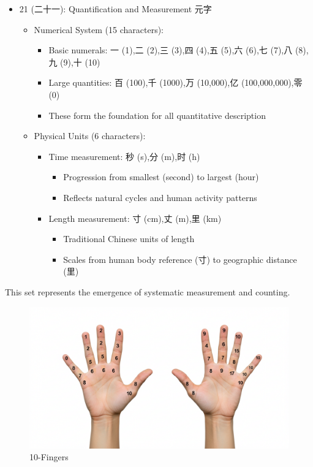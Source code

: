 \documentclass[
  11pt,
  letterpaper,
]{article}
\providecommand{\tightlist}{%
  \setlength{\itemsep}{0pt}\setlength{\parskip}{0pt}}
\begin{document}
\begin{itemize}
\tightlist
\item
  21 (二十一): Quantification and Measurement 元字

  \begin{itemize}
  \tightlist
  \item
    Numerical System (15 characters):

    \begin{itemize}
    \tightlist
    \item
      Basic numerals: 一 (1),二 (2),三 (3),四 (4),五 (5),六 (6),七
      (7),八 (8),九 (9),十 (10)
    \item
      Large quantities: 百 (100),千 (1000),万 (10,000),亿
      (100,000,000),零 (0)
    \item
      These form the foundation for all quantitative description
    \end{itemize}
  \item
    Physical Units (6 characters):

    \begin{itemize}
    \tightlist
    \item
      Time measurement: 秒 (s),分 (m),时 (h)

      \begin{itemize}
      \tightlist
      \item
        Progression from smallest (second) to largest (hour)
      \item
        Reflects natural cycles and human activity patterns
      \end{itemize}
    \item
      Length measurement: 寸 (cm),丈 (m),里 (km)

      \begin{itemize}
      \tightlist
      \item
        Traditional Chinese units of length
      \item
        Scales from human body reference (寸) to geographic distance
        (里)
      \end{itemize}
    \end{itemize}
  \end{itemize}
\end{itemize}

This set represents the emergence of systematic measurement and
counting.

\begin{figure}
\centering
\includegraphics{./images/10-fingers.jpg}
\caption{10-Fingers}
\end{figure}
\end{document}
